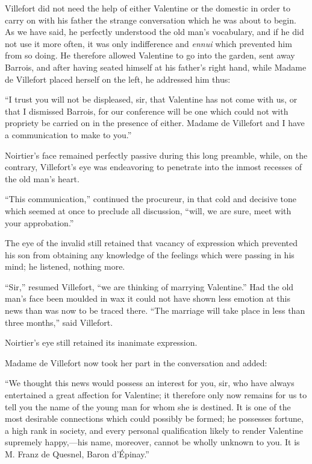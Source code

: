 Villefort did not need the help of either Valentine or the domestic in
order to carry on with his father the strange conversation which he was
about to begin. As we have said, he perfectly understood the old man’s
vocabulary, and if he did not use it more often, it was only
indifference and \textit{ennui} which prevented him from so doing. He
therefore allowed Valentine to go into the garden, sent away Barrois,
and after having seated himself at his father’s right hand, while
Madame de Villefort placed herself on the left, he addressed him thus:

“I trust you will not be displeased, sir, that Valentine has not come
with us, or that I dismissed Barrois, for our conference will be one
which could not with propriety be carried on in the presence of either.
Madame de Villefort and I have a communication to make to you.”

Noirtier’s face remained perfectly passive during this long preamble,
while, on the contrary, Villefort’s eye was endeavoring to penetrate
into the inmost recesses of the old man’s heart.

“This communication,” continued the procureur, in that cold and
decisive tone which seemed at once to preclude all discussion, “will,
we are sure, meet with your approbation.”

The eye of the invalid still retained that vacancy of expression which
prevented his son from obtaining any knowledge of the feelings which
were passing in his mind; he listened, nothing more.

“Sir,” resumed Villefort, “we are thinking of marrying Valentine.” Had
the old man’s face been moulded in wax it could not have shown less
emotion at this news than was now to be traced there. “The marriage
will take place in less than three months,” said Villefort.

Noirtier’s eye still retained its inanimate expression.

Madame de Villefort now took her part in the conversation and added:

“We thought this news would possess an interest for you, sir, who have
always entertained a great affection for Valentine; it therefore only
now remains for us to tell you the name of the young man for whom she
is destined. It is one of the most desirable connections which could
possibly be formed; he possesses fortune, a high rank in society, and
every personal qualification likely to render Valentine supremely
happy,—his name, moreover, cannot be wholly unknown to you. It is M.
Franz de Quesnel, Baron d’Épinay.”

